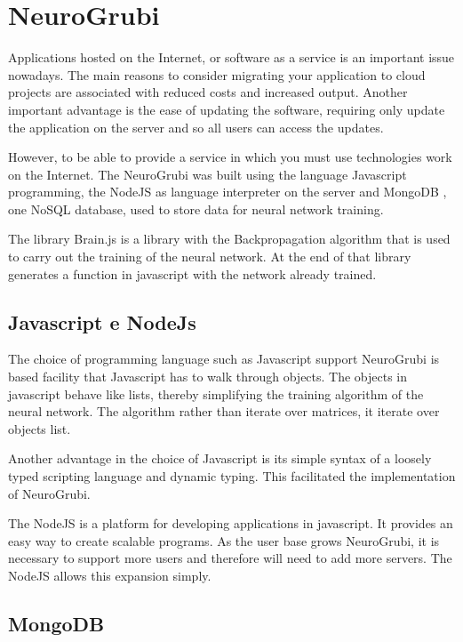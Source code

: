 \section{NeuroGrubi}

Applications hosted on the Internet, or software as a service is an important 
issue nowadays. The main reasons to consider migrating your application to cloud 
projects are associated with reduced costs and increased output. Another 
important advantage is the ease of updating the software, requiring only update 
the application on the server and so all users can access the updates.

However, to be able to provide a service in which you must use technologies
work on the Internet. The NeuroGrubi was built using the language
Javascript programming, the NodeJS \cite{nodejs} as language interpreter on the 
server and MongoDB \cite{mongoDB}, one NoSQL database, used to store data for 
neural network training.

The library Brain.js \cite{brainjs} is a library with the Backpropagation 
algorithm that is used to carry out the training of the neural network. At the 
end of that library generates a function in javascript with the network already 
trained.

\subsection{Javascript e NodeJs}

The choice of programming language such as Javascript support NeuroGrubi is 
based facility that Javascript has to walk through objects. The objects in 
javascript behave like lists, thereby simplifying the training algorithm of the 
neural network. The algorithm rather than iterate over matrices, it iterate 
over objects list.

Another advantage in the choice of Javascript is its simple syntax of a loosely 
typed scripting language and dynamic typing. This facilitated the implementation 
of NeuroGrubi.

The NodeJS is a platform for developing applications in javascript. It provides 
an easy way to create scalable programs. As the user base grows NeuroGrubi, it 
is necessary to support more users and therefore will need to add more servers. 
The NodeJS allows this expansion simply.


\subsection{MongoDB}

